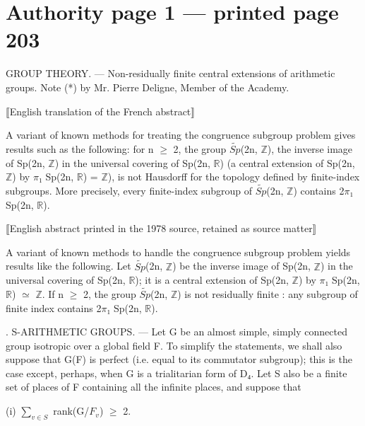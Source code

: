 \documentclass[10pt,a4paper]{article}
\begin{document}
\small
{}\hypertarget{authority-page-0001}{}
\section*{Authority page 1 --- printed page 203}
\noindent GROUP THEORY. — Non-residually finite central extensions of arithmetic groups. Note (*) by Mr. Pierre Deligne, Member of the Academy.\par
\smallskip
\noindent ⟦English translation of the French abstract⟧\par
\noindent A variant of known methods for treating the congruence subgroup problem gives results such as the following: for n \ensuremath{≥} 2, the group \ensuremath{\widetilde{Sp}}(2n, \ensuremath{ℤ}), the inverse image of Sp(2n, \ensuremath{ℤ}) in the universal covering of Sp(2n, \ensuremath{ℝ}) (a central extension of Sp(2n, \ensuremath{ℤ}) by \ensuremath{π₁} Sp(2n, \ensuremath{ℝ}) = \ensuremath{ℤ}), is not Hausdorff for the topology defined by finite-index subgroups. More precisely, every finite-index subgroup of \ensuremath{\widetilde{Sp}}(2n, \ensuremath{ℤ}) contains 2\ensuremath{π₁} Sp(2n, \ensuremath{ℝ}).\par
\smallskip
\noindent ⟦English abstract printed in the 1978 source, retained as source matter⟧\par
\noindent A variant of known methods to handle the congruence subgroup problem yields results like the following. Let \ensuremath{\widetilde{Sp}}(2n, \ensuremath{ℤ}) be the inverse image of Sp(2n, \ensuremath{ℤ}) in the universal covering of Sp(2n, \ensuremath{ℝ}); it is a central extension of Sp(2n, \ensuremath{ℤ}) by \ensuremath{π₁} Sp(2n, \ensuremath{ℝ}) \ensuremath{≃} \ensuremath{ℤ}. If n \ensuremath{≥} 2, the group \ensuremath{\widetilde{Sp}}(2n, \ensuremath{ℤ}) is not residually finite : any subgroup of finite index contains 2\ensuremath{π₁} Sp(2n, \ensuremath{ℝ}).\par
\smallskip
{}. S-ARITHMETIC GROUPS. — Let G be an almost simple, simply connected group isotropic over a global field F. To simplify the statements, we shall also suppose that G(F) is perfect (i.e. equal to its commutator subgroup); this is the case except, perhaps, when G is a trialitarian form of D\ensuremath{₄}. Let S also be a finite set of places of F containing all the infinite places, and suppose that\par
\smallskip
\noindent (i)    \ensuremath{∑_{v∈S}} rank(G/\ensuremath{F_v}) \ensuremath{≥} 2.\par
\end{document}
